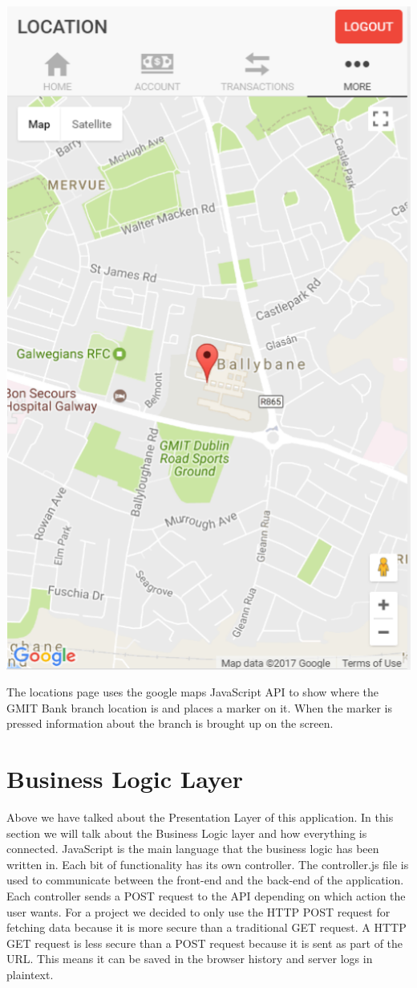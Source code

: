 \begin{center}
    \includegraphics[scale=0.5]{img/Locations.png}
\end{center}
The locations page uses the google maps JavaScript API to show where the GMIT Bank branch location is and places a marker on it. When the marker is pressed information about the branch is brought up on the screen.


\section{Business Logic Layer}
Above we have talked about the Presentation Layer of this application. In this section we will talk about the Business Logic layer and how everything is connected. JavaScript is the main language that the business logic has been written in. Each bit of functionality has its own controller. The controller.js file is used to communicate between the front-end and the back-end of the application.  Each controller sends a POST request to the API depending on which action the user wants. For a project we decided to only use the HTTP POST request for fetching data because it is more secure than a traditional GET request. A HTTP GET request is less secure than a POST request because it is sent as part of the URL. This means it can be saved in the browser history and server logs in plaintext.\cite{http}

